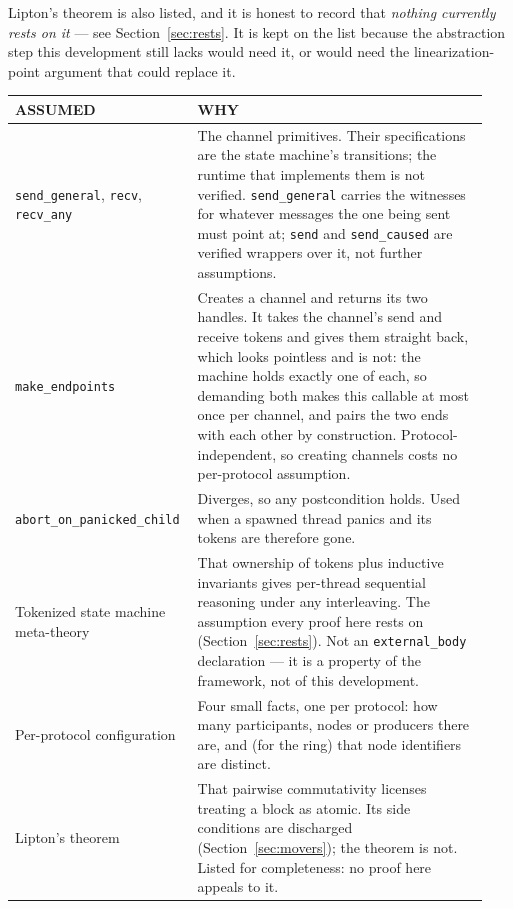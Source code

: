 \documentclass[11pt]{article}
\newcommand{\code}[1]{\texttt{#1}}
\begin{document}
Lipton's theorem is also listed, and it is honest to record that
\emph{nothing currently rests on it} --- see Section~\ref{sec:rests}. It is kept
on the list because the abstraction step this development still lacks would need
it, or would need the linearization-point argument that could replace it.

\begin{center}
\small
\begin{tabular}{@{}p{0.34\linewidth}p{0.60\linewidth}@{}}
\toprule
\textbf{\sffamily\scriptsize\MakeUppercase{Assumed}} &
\textbf{\sffamily\scriptsize\MakeUppercase{Why}} \\
\midrule
\code{send\_general}, \code{recv}, \code{recv\_any}
& The channel primitives. Their specifications are the state machine's
  transitions; the runtime that implements them is not verified.
  \code{send\_general} carries the witnesses for whatever messages the one
  being sent must point at; \code{send} and \code{send\_caused} are verified
  wrappers over it, not further assumptions. \\
\addlinespace
\code{make\_endpoints}
& Creates a channel and returns its two handles. It takes the channel's send
  and receive tokens and gives them straight back, which looks pointless and is
  not: the machine holds exactly one of each, so demanding both makes this
  callable at most once per channel, and pairs the two ends with each other by
  construction. Protocol-independent, so creating channels costs no
  per-protocol assumption. \\
\addlinespace
\code{abort\_on\_panicked\_child}
& Diverges, so any postcondition holds. Used when a spawned thread panics and
  its tokens are therefore gone. \\
\addlinespace
Tokenized state machine
meta-theory
& That ownership of tokens plus inductive invariants gives per-thread
  sequential reasoning under any interleaving. The assumption every proof here
  rests on (Section~\ref{sec:rests}). Not an \code{external\_body} declaration
  --- it is a property of the framework, not of this development. \\
\addlinespace
Per-protocol configuration
& Four small facts, one per protocol: how many participants, nodes or producers
  there are, and (for the ring) that node identifiers are distinct. \\
\addlinespace
Lipton's theorem
& That pairwise commutativity licenses treating a block as atomic. Its side
  conditions are discharged (Section~\ref{sec:movers}); the theorem is not.
  Listed for completeness: no proof here appeals to it. \\
\bottomrule
\end{tabular}
\end{center}
\end{document}
